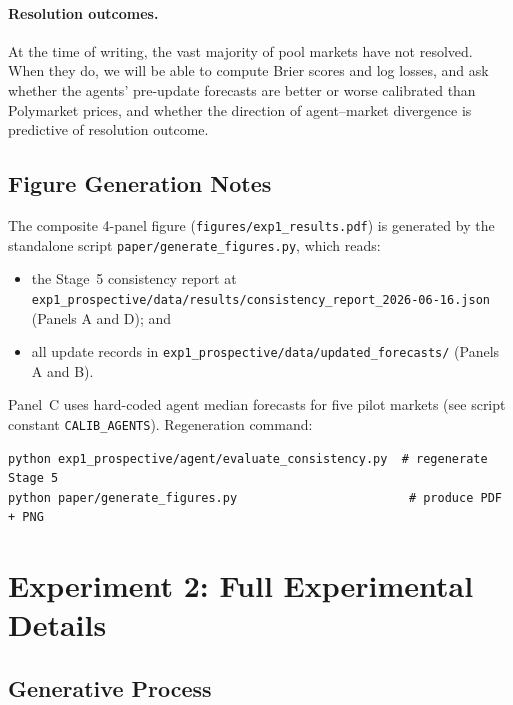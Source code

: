 \documentclass{article} %
\begin{document}
\paragraph{Resolution outcomes.}
At the time of writing, the vast majority of pool markets have not resolved.  When they
do, we will be able to compute Brier scores and log losses, and ask whether the agents'
pre-update forecasts are better or worse calibrated than Polymarket prices, and whether
the direction of agent--market divergence is predictive of resolution outcome.

\subsection{Figure Generation Notes}
\label{app:fig-code}

The composite 4-panel figure (\texttt{figures/exp1\_results.pdf}) is generated by the
standalone script \texttt{paper/generate\_figures.py}, which reads:
\begin{itemize}
  \item the Stage~5 consistency report at
        \texttt{exp1\_prospective/data/results/consistency\_report\_2026-06-16.json}
        (Panels A and D); and
  \item all update records in
        \texttt{exp1\_prospective/data/updated\_forecasts/}
        (Panels A and B).
\end{itemize}
Panel~C uses hard-coded agent median forecasts for five pilot markets (see script
constant \texttt{CALIB\_AGENTS}).  Regeneration command:

\begin{verbatim}
python exp1_prospective/agent/evaluate_consistency.py  # regenerate Stage 5
python paper/generate_figures.py                        # produce PDF + PNG
\end{verbatim}


\section{Experiment 2: Full Experimental Details}
\label{app:exp2}

\subsection{Generative Process}
\label{app:exp2-dgp}
\end{document}
